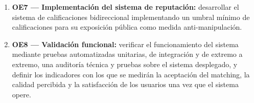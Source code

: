 \begin{enumerate}
    \item \textbf{OE7 --- Implementación del sistema de reputación:}
          desarrollar el sistema de calificaciones bidireccional
          implementando un umbral mínimo de calificaciones para su
          exposición pública como medida anti-manipulación.
    \item \textbf{OE8 --- Validación funcional:} verificar el
          funcionamiento del sistema mediante pruebas automatizadas
          unitarias, de integración y de extremo a extremo, una auditoría
          técnica y pruebas sobre el sistema desplegado, y definir los
          indicadores con los que se medirán la aceptación del
          \gls{matching}, la calidad percibida y la satisfacción de los
          usuarios una vez que el sistema opere.
\end{enumerate}

